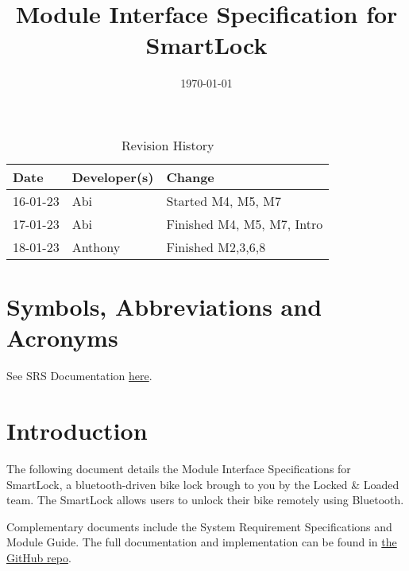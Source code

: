 \documentclass[12pt, titlepage]{article}
\title{Module Interface Specification for SmartLock \progname{}}
\author{\authname}
\date{\today}
\begin{document}
\maketitle
\thispagestyle{empty}

\newpage
{}
\begin{table}[hp]
\caption{Revision History} \label{TblRevisionHistory}
\begin{tabularx}{\textwidth}{llX}
\toprule
\textbf{Date} & \textbf{Developer(s)} & \textbf{Change}\\
\midrule
16-01-23 & Abi & Started M4, M5, M7\\
17-01-23  & Abi & Finished M4, M5, M7, Intro\\
18-01-23 & Anthony & Finished M2,3,6,8\\
\bottomrule
\end{tabularx}
\end{table}


\newpage
\tableofcontents
\listoftables

\newpage
{}

\section{Symbols, Abbreviations and Acronyms}

See SRS Documentation \href{https://github.com/NevoAbigail/Capstone/blob/main/docs/SRS/SRS.pdf}{here}.


\section{Introduction}

The following document details the Module Interface Specifications for
SmartLock, a bluetooth-driven bike lock brough to you by the Locked \& Loaded team. The SmartLock allows users to unlock their bike remotely using Bluetooth. 


Complementary documents include the System Requirement Specifications
and Module Guide.  The full documentation and implementation can be
found in \href{https://github.com/NevoAbigail/Capstone}{the GitHub repo}. %
\end{document}
